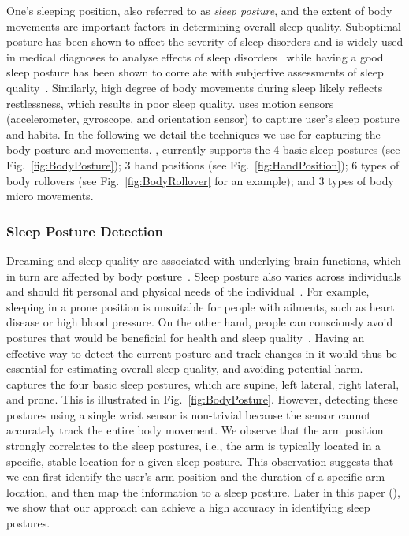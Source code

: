 One's sleeping position, also referred to as {\em sleep posture}, and the extent of body movements are important factors in determining overall sleep quality. Suboptimal posture has been shown to affect the severity of sleep disorders and is widely used in medical diagnoses to analyse effects of sleep disorders~\cite{oksenberg1998effect,eiseman2012impact} while having a good sleep posture has been shown to correlate with subjective assessments of sleep quality~\cite{dekoninck83sleep}. Similarly, high degree of body movements during sleep likely reflects restlessness, which results in poor sleep quality. {\systemname} uses motion sensors (accelerometer, gyroscope, and orientation sensor) to capture user's sleep posture and habits. In the following we detail the techniques we use for capturing the body posture and movements.  {\systemname}, currently supports the 4 basic sleep postures (see Fig.~\ref{fig:BodyPosture}); 3 hand positions (see Fig.~\ref{fig:HandPosition}); 6 types of body rollovers (see Fig.~\ref{fig:BodyRollover} for an example); and 3 types of body micro movements. %


\subsubsection{Sleep Posture Detection\label{sec:sleeppdet}}

Dreaming and sleep quality are associated with underlying brain functions, which in turn are affected by body posture~\cite{posture2004}.
Sleep posture also varies across individuals and should fit personal and physical needs of the individual~\cite{posture2016,posture2017}.
For example, sleeping in a prone position is unsuitable for people with ailments, such as heart disease or high blood pressure. On the
other hand, people can consciously avoid postures that would be beneficial for health and sleep quality~\cite{posture2015}. Having an
effective way to detect the current posture and track changes in it would thus be essential for estimating overall sleep quality, and
avoiding potential harm. \systemname captures the four basic sleep postures, which are supine, left lateral, right lateral, and prone. This
is illustrated in Fig.~\ref{fig:BodyPosture}. However, detecting these postures using a single wrist sensor is non-trivial because the
sensor cannot accurately track the entire body movement. We observe that the arm position strongly correlates to the sleep postures, i.e.,
the arm is typically located in a specific, stable location for a given sleep posture. This observation suggests that we can first identify
the user's arm position and the duration of a specific arm location, and then map the information to a sleep posture. Later in this paper
(), we show that our approach can achieve a high accuracy in identifying sleep postures.





